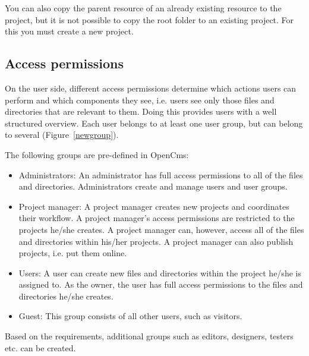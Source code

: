 \begin{itemize}
You can also copy the parent resource of an already existing
resource to the project, but it is not possible to copy the root
folder to an existing project. For this you must create a new
project.

\end{itemize}

\subsection{Access permissions}

On the user side, different access permissions determine which
actions users can perform and which components they see, i.e.
users see only those files and directories that are relevant to
them. Doing this provides users with a well structured overview.
Each user belongs to at least one user group, but can belong to
several (Figure~\ref{newgroup}).

The following groups are pre-defined in OpenCms:

\begin{itemize}
\item Administrators: An administrator has full access permissions to
all of the files and directories. Administrators create and manage
users and user groups.
\item Project manager: A project manager creates new projects and coordinates their workflow. A project manager's access permissions are restricted to the projects he/she creates. A project manager can, however, access all of the files and directories within his/her projects. A project manager can also publish projects, i.e. put them online.
\item Users: A user can create new files and directories within the project he/she is assigned to. As the owner, the user has full access permissions to the files and directories he/she creates.
\item Guest: This group consists of all other users, such as visitors.
\end{itemize}

Based on the requirements, additional groups such as editors,
designers, testers etc. can be created.

